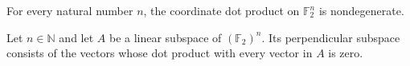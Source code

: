 \begin{theorem}
\leanok
{}
For every natural number $n$, the coordinate dot product on $\mathbb{F}_2^n$ is
nondegenerate.
\end{theorem}

\begin{definition}
\label{FABL.perpendicularSubspace}
\leanok
{}
Let $n\in\mathbb{N}$ and let $A$ be a linear subspace of $(\mathbb{F}_2)^n$. Its
perpendicular subspace consists of the vectors whose dot product with every vector in
$A$ is zero.
\end{definition}

